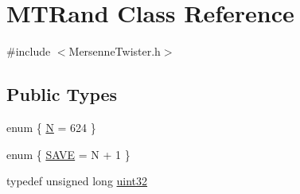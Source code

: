 \hypertarget{classMTRand}{
\section{MTRand Class Reference}
\label{classMTRand}
}


{\ttfamily \#include $<$MersenneTwister.h$>$}\subsection*{Public Types}
\begin{DoxyCompactItemize}
\item 
enum \{ \hyperlink{classMTRand_ab8fea37d16b55e1a0fe06149e325f1b6a60f472facea8fabd42765cd91273db7b}{N} =  624
 \}
\item 
enum \{ \hyperlink{classMTRand_a7d9f4f1783a4e45f7834dd5174dfc2a1a3899803ea0d4da3018d311ed4902d9cc}{SAVE} =  N + 1
 \}
\item 
typedef unsigned long \hyperlink{classMTRand_a45478edf9e24dcd2a5164bac3889d6a2}{uint32}
\end{DoxyCompactItemize}
